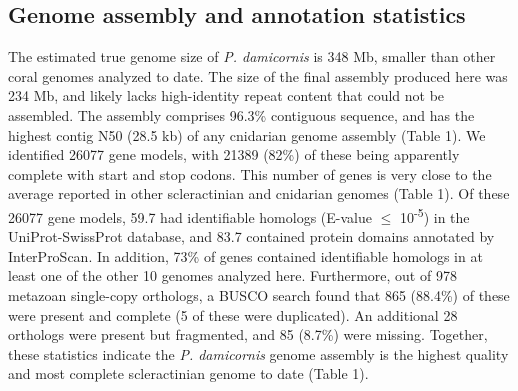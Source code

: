 \documentclass[]{elsarticle} %
\begin{document}
\subsection{Genome assembly and annotation
statistics}\label{genome-assembly-and-annotation-statistics}

The estimated true genome size of \emph{P. damicornis} is 348 Mb,
smaller than other coral genomes analyzed to date. The size of the final
assembly produced here was 234 Mb, and likely lacks high-identity repeat
content that could not be assembled. The assembly comprises 96.3\%
contiguous sequence, and has the highest contig N50 (28.5 kb) of any
cnidarian genome assembly (Table 1). We identified 26077 gene models,
with 21389 (82\%) of these being apparently complete with start and stop
codons. This number of genes is very close to the average reported in
other scleractinian and cnidarian genomes (Table 1). Of these 26077 gene
models, 59.7 had identifiable homologs (E-value \(\leq\)
10\textsuperscript{-5}) in the UniProt-SwissProt database, and 83.7
contained protein domains annotated by InterProScan. In addition, 73\%
of genes contained identifiable homologs in at least one of the other 10
genomes analyzed here. Furthermore, out of 978 metazoan single-copy
orthologs, a BUSCO search found that 865 (88.4\%) of these were present
and complete (5 of these were duplicated). An additional 28 orthologs
were present but fragmented, and 85 (8.7\%) were missing. Together,
these statistics indicate the \emph{P. damicornis} genome assembly is
the highest quality and most complete scleractinian genome to date
(Table 1).
\end{document}
